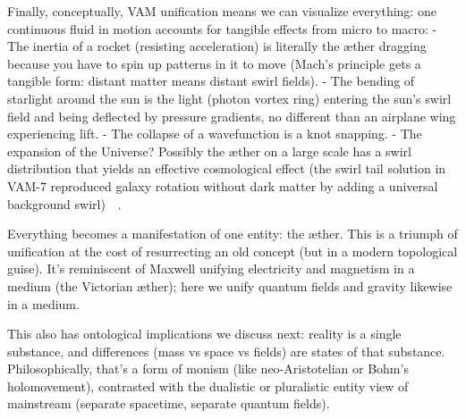 \documentclass[preprint]{revtex4-2}
\begin{document}
    Finally, conceptually, VAM unification means we can visualize everything: one continuous fluid in motion accounts for tangible effects from micro to macro:
    - The inertia of a rocket (resisting acceleration) is literally the æther dragging because you have to spin up patterns in it to move (Mach’s principle gets a tangible form: distant matter means distant swirl fields).
    - The bending of starlight around the sun is the light (photon vortex ring) entering the sun’s swirl field and being deflected by pressure gradients, no different than an airplane wing experiencing lift.
    - The collapse of a wavefunction is a knot snapping.
    - The expansion of the Universe? Possibly the æther on a large scale has a swirl distribution that yields an effective cosmological effect (the swirl tail solution in VAM-7 reproduced galaxy rotation without dark matter by adding a universal background swirl)~\cite{reference_166}~\cite{reference_167}.

    Everything becomes a manifestation of one entity: the æther. This is a triumph of unification at the cost of resurrecting an old concept (but in a modern topological guise). It’s reminiscent of Maxwell unifying electricity and magnetism in a medium (the Victorian æther); here we unify quantum fields and gravity likewise in a medium.

    This also has ontological implications we discuss next: reality is a single substance, and differences (mass vs space vs fields) are states of that substance. Philosophically, that’s a form of monism (like neo-Aristotelian or Bohm’s holomovement), contrasted with the dualistic or pluralistic entity view of mainstream (separate spacetime, separate quantum fields).
\end{document}
